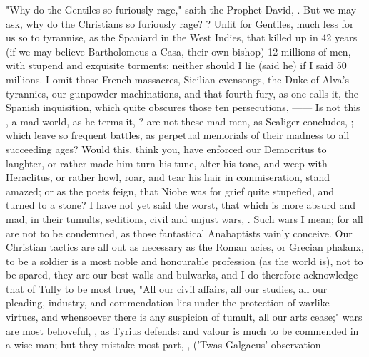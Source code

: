 "Why do the Gentiles so furiously rage," saith the Prophet David,
. But we may ask, why do the Christians so furiously
rage? ?
Unfit for Gentiles, much less for us so to tyrannise, as the Spaniard in the
West Indies, that killed up in 42 years (if we may believe
Bartholomeus a Casa, their own bishop) 12 millions of men,
with stupend and exquisite torments; neither should I lie (said he) if I said
50 millions. I omit those French massacres, Sicilian evensongs,
the Duke of Alva's tyrannies, our gunpowder machinations,
and that fourth fury, as one calls it, the Spanish
inquisition, which quite obscures those ten persecutions,
------  Is not this
, a mad world, as he terms it,
? are not these mad men, as Scaliger
concludes, ; which leave so frequent battles, as
perpetual memorials of their madness to all succeeding ages? Would this, think
you, have enforced our Democritus to laughter, or rather made him turn his
tune, alter his tone, and weep with Heraclitus, or rather
howl, roar, and tear his hair in commiseration, stand
amazed; or as the poets feign, that Niobe was for grief quite stupefied, and
turned to a stone? I have not yet said the worst, that which is more absurd and
mad, in their tumults, seditions, civil and unjust wars,
.
Such wars I mean; for all are not to be condemned, as those fantastical
Anabaptists vainly conceive. Our Christian tactics are all out as necessary as
the Roman acies, or Grecian phalanx, to be a soldier is a most noble and
honourable profession (as the world is), not to be spared, they are our best
walls and bulwarks, and I do therefore acknowledge that of
Tully to be most true, "All our civil affairs, all our
studies, all our pleading, industry, and commendation lies under the protection
of warlike virtues, and whensoever there is any suspicion of tumult, all our
arts cease;" wars are most behoveful, , as Tyrius defends: and valour is much to be
commended in a wise man; but they mistake most part, , \etc{} ('Twas Galgacus' observation
